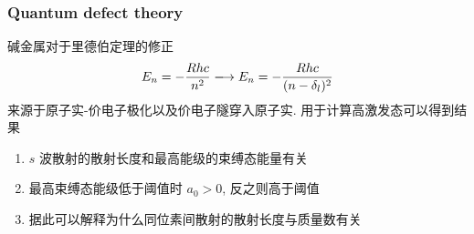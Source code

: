 \documentclass[10pt,a4paper,twocolumn]{article} %
\numberwithin{equation}{section} %
\begin{document}
\subsubsection{Quantum defect theory} %
\label{ssub:quantum_defect_theory}
碱金属对于里德伯定理的修正
\begin{equation}
	E_n = -\frac{Rhc}{n^2} \xlongrightarrow{} E_n = -\frac{Rhc}{(n-\delta_l)^2}
\end{equation}
来源于原子实-价电子极化以及价电子隧穿入原子实. 用于计算高激发态可以得到结果
\begin{enumerate}
	\item $s$ 波散射的散射长度和最高能级的束缚态能量有关
	\item 最高束缚态能级低于阈值时 $a_0>0$, 反之则高于阈值
	\item 据此可以解释为什么同位素间散射的散射长度与质量数有关
\end{enumerate}
\end{document}
